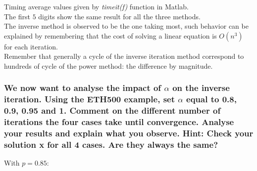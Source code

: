 \documentclass[unicode,11pt,a4paper,oneside,numbers=endperiod,openany]{scrartcl}
\begin{document}
Timing average values given by \textit{timeit(f)} function in Matlab. \\
The first $5$ digits show the same result for all the three methods. \\
The inverse method is observed to be the one taking most, such behavior can be explained by remembering that
the cost of solving a linear equation is $O(n^3)$ for each iteration. \\
Remember that generally a cycle of the inverse iteration method correspond to $~$ hundreds
of cycle of the power method: the difference by magnitude.

\subsubsection{We now want to analyse the impact of $\alpha$ on the inverse iteration.
    Using the ETH500 example, set $\alpha$ equal to 0.8, 0.9, 0.95 and 1.
    Comment on the different number of iterations the four cases take until convergence.
    Analyse your results and explain what you observe.
    Hint: Check your solution x for all 4 cases. Are they always the same?}

With $p = 0.85$:
\end{document}
